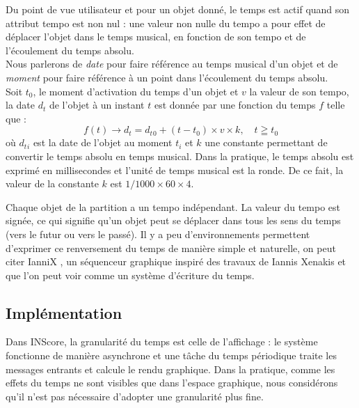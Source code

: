 \documentclass{article}
\begin{document}
Du point de vue utilisateur et pour un objet donné, le temps est actif quand son attribut tempo est non nul : une valeur non nulle du tempo a pour effet de déplacer l'objet dans le temps musical, en fonction de son tempo et de l'écoulement du temps absolu. \\
Nous parlerons de \emph{date} pour faire référence au temps musical d'un objet et de \emph{moment} pour faire référence à un point dans l'écoulement du temps absolu. \\

Soit $t_0$, le moment d'activation du temps d'un objet et $v$ la valeur de son tempo, la date $d_t$ de l'objet à un instant $t$ est donnée par une fonction du temps $f$ telle que :
\begin{equation}
	 f(t) \to d_t = d_t{_0} + (t - t_0) \times v \times k , \quad t \geqq t_0
\label{timeeq}
\end{equation}
où $d_t{_i}$ est la date de l'objet au moment $t_i$ et $k$ une constante permettant de convertir le temps absolu en temps musical. Dans la pratique, le temps absolu est exprimé en millisecondes et l'unité de temps musical est la ronde. De ce fait, la valeur de la constante $k$ est $1 / 1000 \times 60 \times 4$.

Chaque objet de la partition a un tempo indépendant. La valeur du tempo est signée, ce qui signifie qu'un objet peut se déplacer dans tous les sens du temps (vers le futur ou vers le passé). Il y a peu d'environnements permettent d'exprimer ce renversement du temps de manière simple et naturelle, on peut citer IanniX \cite{iannix14}, un séquenceur graphique inspiré des travaux de Iannis Xenakis et que l'on peut voir comme un système d'écriture du temps.

\subsection{Implémentation}

Dans INScore, la granularité du temps est celle de l'affichage : le système fonctionne de manière asynchrone et une tâche du temps périodique traite les messages entrants et calcule le rendu graphique. Dans la pratique, comme les effets du temps ne sont visibles que dans l'espace graphique, nous considérons qu'il n'est pas nécessaire d'adopter une granularité plus fine. 
\end{document}
